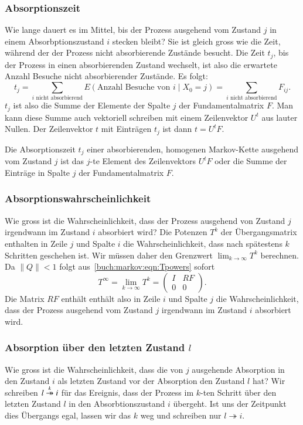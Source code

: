 \subsubsection{Absorptionszeit}
%
Wie lange dauert es im Mittel, bis der Prozess ausgehend vom Zustand $j$
in einem Absorbptionszustand $i$ stecken bleibt?
Sie ist gleich gross wie die Zeit, während der der Prozess nicht absorbierende
Zustände besucht.
Die Zeit $t_j$, bis der Prozess in einen absorbierenden Zustand wechselt, ist also
die erwartete Anzahl Besuche nicht absorbierender Zustände.
Es folgt:
\[
t_j
=
\sum_{\text{$i$ nicht absorbierend}} E(\text{Anzahl Besuche von $i$}\mid X_0=j)
=
\sum_{\text{$i$ nicht absorbierend}} F_{i\!j}.
\]
$t_j$ ist also die Summe der Elemente der Spalte $j$ der Fundamentalmatrix $F$.
Man kann diese Summe auch vektoriell schreiben mit einem Zeilenvektor $U^t$
aus lauter Nullen.
Der Zeilenvektor $t$ mit Einträgen $t_j$ ist dann
\(
t = U^tF.
\)
\begin{satz}
\label{buch:markov:satz:absorptionszeit}
Die Absorptionszeit $t_j$ einer absorbierenden, homogenen Markov-Kette
ausgehend vom Zustand $j$ ist
das $j$-te Element des Zeilenvektors $U^tF$ oder die Summe der
Einträge in Spalte $j$ der Fundamentalmatrix $F$.
\end{satz}

\subsubsection{Absorptionswahrscheinlichkeit}
%
Wie gross ist die Wahrscheinlichkeit, dass der Prozess ausgehend von
Zustand $j$ irgendwann im Zustand $i$ absorbiert wird?
Die Potenzen $T^k$ der Übergangsmatrix enthalten in Zeile $j$
und Spalte $i$ die Wahrscheinlichkeit, dass nach spätestens $k$ Schritten
geschehen ist.
Wir müssen daher den Grenzwert
\(
\lim_{k\to\infty}T^k
\)
berechnen.
Da $\|Q\|<1$ folgt aus~\eqref{buch:markov:eqn:Tpowers} sofort
\[
T^\infty
=
\lim_{k\to\infty}T^k
=
\left(
\begin{array}{cc}
I&RF\\
0&0
\end{array}
\right).
\]
Die Matrix $RF$ enthält enthält also in Zeile $i$ und Spalte $j$
die Wahrscheinlichkeit, dass der Prozess ausgehend vom Zustand $j$
irgendwann im Zustand $i$ absorbiert wird.

\subsubsection{Absorption über den letzten Zustand $l$}
Wie gross ist die Wahrscheinlichkeit, dass die von $j$ ausgehende
Absorption in den Zustand $i$ als letzten Zustand vor der Absorption
den Zustand $l$ hat?
Wir schreiben $l\overset{\smash{k}}{\twoheadrightarrow} i$ für das Ereignis, dass der Prozess
im $k$-ten Schritt über den letzten
Zustand $l$ in den Absorbtionszustand $i$ übergeht.
Ist uns der Zeitpunkt dies Übergangs egal, lassen wir das $k$
weg und schreiben nur $l\twoheadrightarrow i$.


